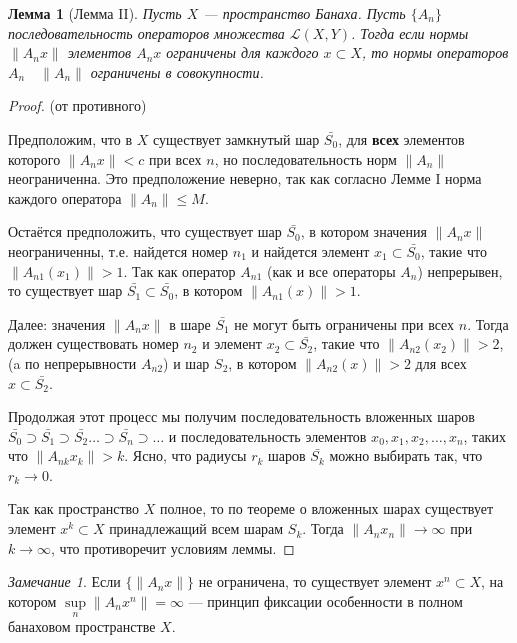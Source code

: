 \documentclass[12pt,a4paper,titlepage, oneside]{book}
\theoremstyle{definition}
\theoremstyle{plain}
\theoremstyle{remark}
\newtheorem*{remark}{Замечание}
\theoremstyle{remark}
\theoremstyle{remark}
\theoremstyle{remark}
\theoremstyle{plain}
\newtheorem*{lemma}{Лемма}
\theoremstyle{plain}
\begin{document}
\begin{lemma}[Лемма II]
Пусть $X$ --- пространство Банаха. Пусть $\lbrace A_n\rbrace$ последовательность операторов множества $\mathcal{L}(X,Y)$. Тогда если нормы $\lVert A_n x\rVert$ элементов $A_n x$ ограничены для каждого $x \subset X$, то нормы операторов $A_n \quad \lVert A_n\rVert$ ограничены в совокупности.
\end{lemma}

\begin{proof}
(от противного)

Предположим, что в $X$ существует замкнутый шар $\bar{S_0}$, для \textbf{всех} элементов которого $\lVert A_n x\rVert < c$ при всех $n$, но последовательность норм $\lVert A_n\rVert$ неограниченна. Это предположение неверно, так как согласно Лемме I норма каждого оператора $\lVert A_n\rVert \le M$.

Остаётся предположить, что существует шар $\bar{S_0}$, в котором значения $\lVert A_n x\rVert$ неограниченны, т.е. найдется номер $n_1$ и найдется элемент $x_1 \subset \bar{S_0}$, такие что $\lVert A_{n1} (x_1)\rVert > 1$. Так как оператор $A_{n1}$ (как и все операторы $A_n$) непрерывен, то существует шар $\bar{S_1} \subset \bar{S_0}$, в котором $\lVert A_{n1} (x)\rVert > 1$.

Далее: значения $\lVert A_n x\rVert$ в шаре $\bar{S_1}$ не могут быть ограничены при всех $n$. Тогда должен существовать номер $n_2$ и элемент $x_2 \subset \bar{S_2}$, такие что $\lVert A_{n2} (x_2)\rVert > 2$, (a по непрерывности $A_{n2}$) и шар $S_2$, в котором $\lVert A_{n2} (x)\rVert > 2$ для всех $x \subset \bar{S_2}$.

Продолжая этот процесс мы получим последовательность вложенных шаров $\bar{S_0} \supset \bar{S_1} \supset \bar{S_2} \ldots \supset \bar{S_n} \supset \ldots$ и последовательность элементов $x_0, x_1, x_2, \ldots, x_n$, таких что $\lVert A_{nk} x_k\rVert > k$. Ясно, что радиусы $r_k$ шаров $\bar{S_k}$ можно выбирать так, что $r_k \to 0$.

Так как пространство $X$ полное, то по теореме о вложенных шарах существует элемент $x^k \subset X$ принадлежащий всем шарам $S_k$. Тогда $\lVert A_n x_n\rVert \to \infty$ при $k \to \infty$, что противоречит условиям леммы.
\end{proof}

\begin{remark}
Если $\lbrace \lVert A_n x\rVert \rbrace$ не ограничена, то существует элемент $x^n \subset X$, на котором $\sup\limits_{n}\lVert A_n x^n\rVert = \infty$ --- принцип фиксации особенности в полном банаховом пространстве $X$.
\end{remark}
\end{document}
